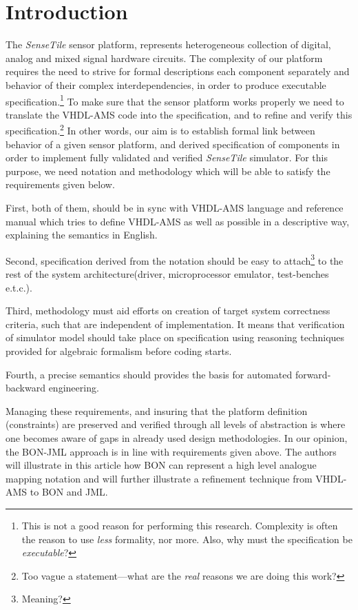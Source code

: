\documentclass{article}
\newcommand{\ST}{\emph{SenseTile}\xspace}
\begin{document}
\section{Introduction}
\label{sec:introduction}

The \ST sensor platform, represents heterogeneous collection of
digital, analog and mixed signal hardware circuits.  The complexity of
our platform requires the need to strive for formal descriptions each
component separately and behavior of their complex interdependencies,
in order to produce executable specification.\footnote{This is not a
  good reason for performing this research.  Complexity is often the
  reason to use \emph{less} formality, nor more.  Also, why must the
  specification be \emph{executable}?}  To make sure that the sensor
platform works properly we need to translate the VHDL-AMS code into
the specification, and to refine and verify this
specification.\footnote{Too vague a statement---what are the
  \emph{real} reasons we are doing this work?}  In other words, our
aim is to establish formal link between behavior of a given sensor
platform, and derived specification of components in order to
implement fully validated and verified \ST simulator.  For this
purpose, we need notation and methodology which will be able to
satisfy the requirements given below.

First, both of them, should be in sync with VHDL-AMS language and
reference manual which tries to define VHDL-AMS as well as possible in
a descriptive way, explaining the semantics in English.

Second, specification derived from the notation should be easy to
attach\footnote{Meaning?} to the rest of the system
architecture\xspace(driver, microprocessor emulator, test-benches
e.t.c.).

Third, methodology must aid efforts on creation of target system
correctness criteria, such that are independent of implementation.  It
means that verification of simulator model should take place on
specification using reasoning techniques provided for algebraic
formalism before coding starts.

Fourth, a precise semantics should provides the basis for automated
forward-backward engineering.

Managing these requirements, and insuring that the platform definition
(constraints) are preserved and verified through all levels of
abstraction is where one becomes aware of gaps in already used design
methodologies.  In our opinion, the BON-JML approach is in line with
requirements given above.  The authors will illustrate in this article
how BON can represent a high level analogue mapping notation and will
further illustrate a refinement technique from VHDL-AMS to BON and
JML.
\end{document}
